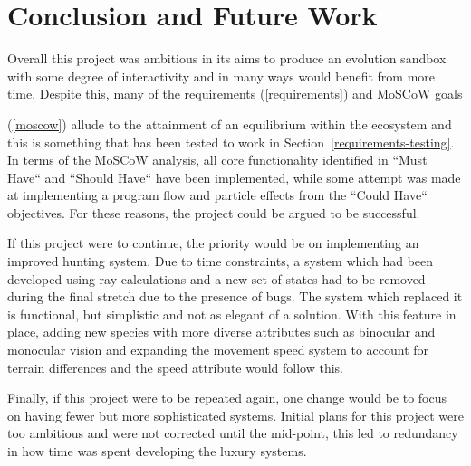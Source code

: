\documentclass[a4paper, oneside, 11pt]{report}
\begin{document}
\chapter{Conclusion and Future Work}\label{conclusion}
Overall this project was ambitious in its aims to produce an evolution sandbox with some degree of interactivity and in many ways would benefit from more time. Despite this, many of the requirements (\ref{requirements}) and MoSCoW goals {(\ref{moscow}) allude to the attainment of an equilibrium within the ecosystem and this is something that has been tested to work in Section~\ref{requirements-testing}. In terms of the MoSCoW analysis, all core functionality identified in ``Must Have`` and ``Should Have`` have been implemented, while some attempt was made at implementing a program flow and particle effects from the ``Could Have`` objectives. For these reasons, the project could be argued to be successful.

If this project were to continue, the priority would be on implementing an improved hunting system. Due to time constraints, a system which had been developed using ray calculations and a new set of states had to be removed during the final stretch due to the presence of bugs. The system which replaced it is functional, but simplistic and not as elegant of a solution. With this feature in place, adding new species with more diverse attributes such as binocular and monocular vision and expanding the movement speed system to account for terrain differences and the speed attribute would follow this.

Finally, if this project were to be repeated again, one change would be to focus on having fewer but more sophisticated systems. Initial plans for this project were too ambitious and were not corrected until the mid-point, this led to redundancy in how time was spent developing the luxury systems.




}
\end{document}
